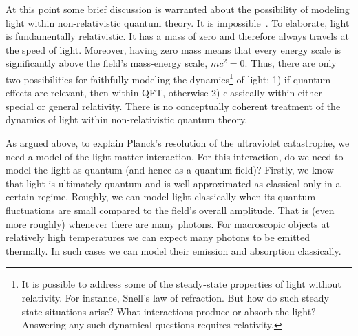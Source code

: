 \documentclass[prd,twocolumn,superscriptaddress,floatfix,amsmath,amssymb,amsfonts,nofootinbib]{revtex4-2}
\begin{document}
At this point some brief discussion is warranted about the possibility of modeling light within non-relativistic quantum theory. It is impossible~\cite{Lamb1995}. To elaborate, light is fundamentally relativistic. It has a mass of zero and therefore always travels at the speed of light. Moreover, having zero mass means that every energy scale is significantly above the field's mass-energy scale, $mc^2=0$. Thus, there are only two possibilities for faithfully modeling the dynamics\footnote{It is possible to address some of the steady-state properties of light without relativity. For instance, Snell's law of refraction. But how do such steady state situations arise? What interactions produce or absorb the light? Answering any such dynamical questions requires relativity.} of light: 1) if quantum effects are relevant, then within QFT, otherwise 2) classically within either special or general relativity. There is no conceptually coherent treatment of the dynamics of light within non-relativistic quantum theory.

As argued above, to explain Planck's resolution of the ultraviolet catastrophe, we need a model of the light-matter interaction. For this interaction, do we need to model the light as quantum (and hence as a quantum field)? Firstly, we know that light is ultimately quantum and is well-approximated as classical only in a certain regime. Roughly, we can model light classically when its quantum fluctuations are small compared to the field's overall amplitude. That is (even more roughly) whenever there are many photons. For macroscopic objects at relatively high temperatures we can expect many photons to be emitted thermally. In such cases we can model their emission and absorption classically.
\end{document}
